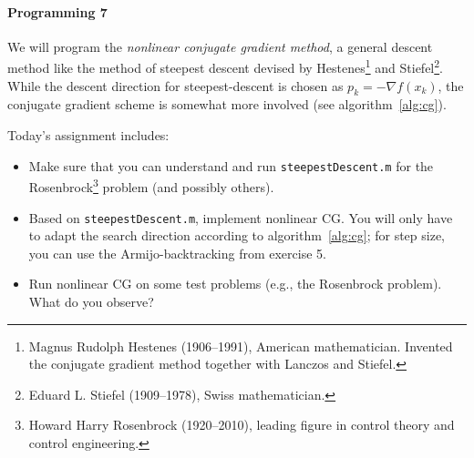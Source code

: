%
%

\paragraph{Programming 7}
We will program the \emph{nonlinear conjugate gradient method}, a general
descent method like the method of steepest descent devised by
Hestenes\footnote{Magnus Rudolph Hestenes (1906--1991), American
mathematician. Invented the conjugate gradient method together with Lanczos
and Stiefel.} and Stiefel\footnote{Eduard L. Stiefel (1909--1978), Swiss
mathematician.}.
While the descent
direction for steepest-descent is chosen as $p_k=-\nabla f(x_k)$, the
conjugate gradient scheme is somewhat more involved (see algorithm~\ref{alg:cg}).

Today's assignment includes:
\begin{itemize}
    \item Make sure that you can understand and run \texttt{steepestDescent.m}
      for the Rosenbrock\footnote{Howard Harry Rosenbrock (1920--2010),
      leading figure in control theory and control engineering.} problem (and
      possibly others).
    \item Based on \texttt{steepestDescent.m}, implement nonlinear CG. You
      will only have to adapt the search direction according to
      algorithm~\ref{alg:cg}; for step size, you can use the
      Armijo-backtracking from exercise 5.
    \item Run nonlinear CG on some test problems (e.g., the Rosenbrock
      problem). What do you observe?
\end{itemize}

